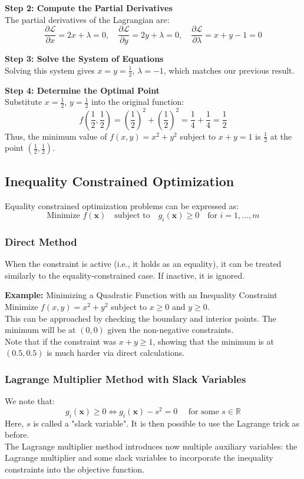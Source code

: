 \documentclass[]{article}
\newcommand{\R}{\mathbb{R}}
\begin{document}
	\textbf{Step 2: Compute the Partial Derivatives}\\
	The partial derivatives of the Lagrangian are:
	$$
	\frac{\partial \mathcal{L}}{\partial x} = 2x + \lambda = 0, \quad \frac{\partial \mathcal{L}}{\partial y} = 2y + \lambda = 0, \quad \frac{\partial \mathcal{L}}{\partial \lambda} = x + y - 1 = 0
	$$
	
	\textbf{Step 3: Solve the System of Equations}\\
	Solving this system gives $x = y = \frac{1}{2}$, $\lambda = -1$, which matches our previous result.
	
	\textbf{Step 4: Determine the Optimal Point}\\
	Substitute $x = \frac{1}{2}$, $y = \frac{1}{2}$ into the original function:
	$$
	f\left(\frac{1}{2}, \frac{1}{2}\right) = \left(\frac{1}{2}\right)^2 + \left(\frac{1}{2}\right)^2 = \frac{1}{4} + \frac{1}{4} = \frac{1}{2}
	$$
	Thus, the minimum value of $f(x, y) = x^2 + y^2$ subject to $x + y = 1$ is $\frac{1}{2}$ at the point $\left(\frac{1}{2}, \frac{1}{2}\right)$.
	
	\subsection{Inequality Constrained Optimization}
	Equality constrained optimization problems can be expressed as:
	$$
	\text{Minimize } f(\mathbf{x})
	\quad
	\text{subject to}
	\quad
	g_i(\mathbf{x}) \geq 0
	\quad
	\text{for } i = 1, \dots, m
	$$
	
	\subsubsection{Direct Method}
	When the constraint is active (i.e., it holds as an equality), it can be treated similarly to the equality-constrained case.
	If inactive, it is ignored.
	
	\textbf{Example:}
	Minimizing a Quadratic Function with an Inequality Constraint
	\\
	Minimize $f(x, y) = x^2 + y^2$ subject to $x \geq 0$ and $y \geq 0$.
	\\
	This can be approached by checking the boundary and interior points.
	The minimum will be at $(0,0)$ given the non-negative constraints.
	\\
	Note that if the constraint was $x+y \geq 1$, showing that the minimum is at $(0.5, 0.5)$ is much harder via direct calculations.
	
	\subsubsection{Lagrange Multiplier Method with Slack Variables}
	We note that:
	$$
	g_i(\mathbf{x}) \geq 0
	\iff
	g_i(\mathbf{x}) -s^2 = 0
	\quad
	\text{ for some } s \in \R
	$$
	Here, $s$ is called a "slack variable".
	It is then possible to use the Lagrange trick as before.
	\\
	The Lagrange multiplier method introduces now multiple auxiliary variables: the Lagrange multiplier and some slack variables to incorporate the inequality constraints into the objective function.
	
\end{document}
